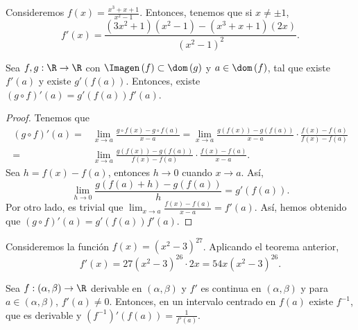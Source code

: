 \begin{eg}
\normalfont Consideremos $\displaystyle f\left(x\right) = \frac{x^{3}+x+1}{x^{2}-1} $. Entonces, tenemos que si $\displaystyle x \neq \pm 1 $,
\[ f'\left(x\right) = \frac{\left(3x^{2}+1\right)\left(x^{2}-1\right)-\left(x^{3}+x+1\right)\left(2x\right)}{\left(x^{2}-1\right)^{2}} .\]
\end{eg}
\begin{ftheorem}
\normalfont Sea $\displaystyle f,g : \R \to \R $ con $\displaystyle \Imagen\left(f\right) \subset \dom\left(g\right) $ y $\displaystyle a \in \dom\left(f\right) $, tal que existe $\displaystyle f'\left(a\right) $ y existe $\displaystyle g'\left(f\left(a\right)\right) $. Entonces, existe $\displaystyle \left(g \circ f\right)'\left(a\right) = g'\left(f\left(a\right)\right) f'\left(a\right) $.
\end{ftheorem}
\begin{proof}
Tenemos que
\[
\begin{split}
	\left(g\circ f\right)'\left(a\right) =& \lim_{x \to a}\frac{g\circ f\left(x\right) - g\circ f\left(a\right)}{x-a} = \lim_{x \to a}\frac{g\left(f\left(x\right)\right)-g\left(f\left(a\right)\right)}{x-a} \cdot \frac{f\left(x\right)-f\left(a\right)}{f\left(x\right)-f\left(a\right)} \\
	= & \lim_{x \to a} \frac{g\left(f\left(x\right)\right)-g\left(f\left(a\right)\right)}{f\left(x\right)-f\left(a\right)} \cdot \frac{f\left(x\right)-f\left(a\right)}{x - a} .
\end{split}
\]
Sea $\displaystyle h = f\left(x\right)-f\left(a\right) $, entonces $\displaystyle h\to0 $ cuando $\displaystyle x \to a $. Así,
\[\lim_{h \to 0} \frac{g\left(f\left(a\right)+h\right)-g\left(f\left(a\right)\right)}{h} = g'\left(f\left(a\right)\right) .\]
Por otro lado, es trivial que $\displaystyle \lim_{x \to a}\frac{f\left(x\right)-f\left(a\right)}{x-a} = f'\left(a\right) $. Así, hemos obtenido que $\displaystyle \left(g\circ f\right)'\left(a\right) = g'\left(f\left(a\right)\right) f'\left(a\right) $.
\end{proof}
\begin{eg}
\normalfont Consideremos la función $\displaystyle f\left(x\right) = \left(x^{2}-3\right)^{27} $. Aplicando el teorema anterior,
\[f'\left(x\right) = 27\left(x^{2}-3\right)^{26} \cdot 2x = 54x\left(x^{2}-3\right)^{26} .\]
\end{eg}
\begin{ftheorem}
\normalfont Sea $\displaystyle f: \left(\alpha, \beta \right) \to \R $ derivable en $\displaystyle \left(\alpha, \beta \right) $ y $\displaystyle f' $ es continua en $\displaystyle \left(\alpha, \beta \right) $ y para $\displaystyle a \in \left(\alpha, \beta \right) $, $\displaystyle f'\left(a\right) \neq 0 $. Entonces, en un intervalo centrado en $\displaystyle f\left(a\right) $ existe $\displaystyle f^{-1} $, que es derivable y $\displaystyle \left(f^{-1} \right)' \left(f\left(a\right)\right)= \frac{1}{f'\left(a\right)}$.
\end{ftheorem}

